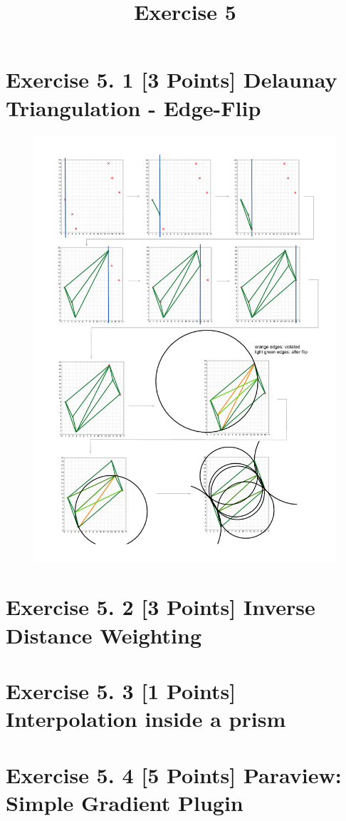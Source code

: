 \documentclass[a4paper]{article}
\date{}
\author{}
\title{Exercise 5}
\begin{document}
	
	\maketitle 
	\thispagestyle{fancy}
	

	
	\section*{Exercise 5. 1 [3 Points] Delaunay Triangulation - Edge-Flip}
	
	\begin{figure}[h!]
		\centering
		\includegraphics[width=0.79\linewidth]{delaunay.pdf}
		\label{fig:diagram}
	\end{figure}

	\clearpage
	
	\section*{Exercise 5. 2 [3 Points] Inverse Distance Weighting}
	

	

	
	
	
	\section*{Exercise 5. 3 [1 Points] Interpolation inside a prism}
	
	
	
	\section*{Exercise 5. 4 [5 Points] Paraview: Simple Gradient Plugin}
	
	
	
\end{document}
